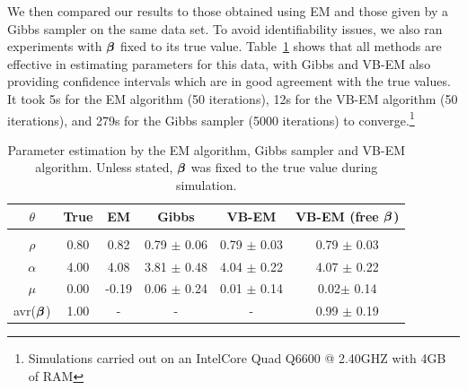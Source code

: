 \documentclass{article}
\begin{document}
We then compared our results to those obtained using EM \cite{Smith_2003} and those given by a Gibbs sampler on the same data set. To avoid identifiability issues, we also ran experiments with ${\bm \beta}$ fixed to its true value. Table~\ref{tab:Parest} shows that all methods are
effective in estimating parameters for this data, with Gibbs and VB-EM also providing confidence
intervals which are in good agreement with the true values. It took 5s for the EM algorithm (50 iterations), 12s for the VB-EM algorithm (50 iterations), and 279s for the Gibbs sampler (5000 iterations) to converge.\footnote{Simulations
carried out on an Intel\textregistered Core Quad Q6600 @ 2.40GHZ with 4GB of RAM}
	
\begin{table}[t] \caption{Parameter estimation by the EM algorithm, Gibbs sampler and VB-EM
	algorithm. Unless stated, ${\bm \beta}$ was fixed to the true value during simulation.}
	\label{tab:Parest} \begin{center} \begin{tabular}{c|c|c|c|c|c} $\theta$
		&{\bf True}  	&{\bf EM} &{\bf Gibbs}  &{\bf VB-EM} &{\bf VB-EM} (free ${\bm \beta}$) \\
		\hline &&&  \\[-2ex]
		$\rho$ 		&	0.80	&0.82	  & 0.79 $\pm$ 0.06 & 0.79 $\pm$ 0.03	  &	0.79 $\pm$ 0.03	 \\
		$\alpha$ 	&	4.00		&4.08	  & 3.81 $\pm$ 0.48	 & 4.04 $\pm$ 0.22	  &	4.07 $\pm$ 0.22   \\
		$\mu $		&	0.00	&-0.19	& 0.06 $\pm$ 0.24	 & 0.01 $\pm$ 0.14	&	0.02$\pm$ 0.14	 \\
		avr(${\bm \beta}$)	&	1.00&  -	&         -		&	        -         &	0.99 $\pm$ 0.19	\\
\end{tabular} \end{center}
	\end{table}
\end{document}
